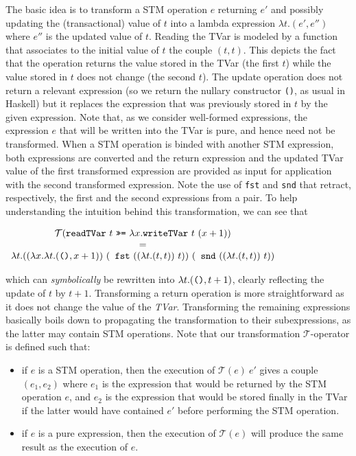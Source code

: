 \documentclass[submission,copyright,creativecommons]{eptcs}
\newcommand{\code}[1]{\textrm{{\tt #1}}}
\newcommand{\readTVarONLY}{\ensuremath{\code{readTVar}}}
\newcommand{\readTVar}[1]{\ensuremath{\readTVarONLY \ #1}}
\newcommand{\writeTVarONLY}{\ensuremath{\code{writeTVar}}}
\newcommand{\writeTVar}[2]{\ensuremath{\writeTVarONLY \ #1 \ #2}}
\newcommand{\bindTM}{\ \ensuremath{\code{>>=}} \ }
\newcommand{\pt}{\ensuremath{\mathcal{T}}}
\begin{document}
The basic idea is to transform a STM operation $e$ returning $e'$ and possibly updating the (transactional) value of $t$ into a lambda expression $\lambda t.(e',e'')$ where $e''$ is the updated value of $t$. 
Reading the TVar is modeled by a function that associates to the initial value of $t$ the couple $(t,t)$. This depicts the fact that the operation returns the value stored in the TVar (the first $t$) while the value stored in $t$ does not change (the second $t$). 
The update operation does not return a relevant expression (so we return the nullary constructor \texttt{()}, as usual in Haskell) but it replaces the expression that was previously stored in $t$ by the given expression. 
Note that, as we consider well-formed expressions, the expression $e$ that will be written into the TVar is pure, and hence need not be transformed.
When a STM operation is binded with another STM expression, both expressions are converted and the return expression and the updated TVar value of the first transformed expression are provided as input for application with the second transformed expression. Note the use of \texttt{fst} and \texttt{snd} that retract, respectively, the first and the second expressions from a pair.
To help understanding the intuition behind this transformation, we can see that 
\begin{center}
  \begin{math}
    \begin{array}{c} \pt(\readTVar{t} \bindTM \lambda x.\writeTVar{t}{(x+1)}) \\
      = \\
      \lambda t.((\lambda x.\lambda t.(\code{()},x+1)) \ (\code{fst} \ ((\lambda t.(t,t)) \ t)) \ (\code{snd} \ ((\lambda t.(t,t)) \ t))
    \end{array}
  \end{math}
\end{center}
which can  \emph{symbolically} \cite{compiling-haskell-program} be rewritten into $\lambda t . (\code{()},t+1)$, clearly reflecting the update of $t$ by $t+1$.
Transforming a return operation is more straightforward as it does not change the value of the \emph{TVar}.
Transforming the remaining expressions basically boils down to propagating the transformation to their subexpressions, as the latter may contain STM operations.
Note that our transformation $\pt$-operator is defined such that:
\begin{itemize}
\item if $e$ is a STM operation, then the execution of $\pt(e) \ e'$ gives a couple $(e_1,e_2)$ where $e_1$ is the expression that would be returned by the STM operation $e$, and $e_2$ is the expression that would be stored finally in the TVar if the latter would have contained $e'$ before performing the STM operation.  
\item if $e$ is a pure expression, then the execution of $\pt(e)$ will produce the same result as the execution of $e$.
\end{itemize}
\end{document}
